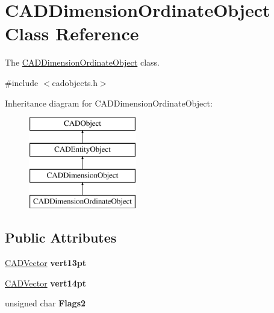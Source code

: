 \hypertarget{class_c_a_d_dimension_ordinate_object}{}\section{C\+A\+D\+Dimension\+Ordinate\+Object Class Reference}
\label{class_c_a_d_dimension_ordinate_object}


The \hyperlink{class_c_a_d_dimension_ordinate_object}{C\+A\+D\+Dimension\+Ordinate\+Object} class.  




{\ttfamily \#include $<$cadobjects.\+h$>$}

Inheritance diagram for C\+A\+D\+Dimension\+Ordinate\+Object\+:\begin{figure}[H]
\begin{center}
\leavevmode
\includegraphics[height=4.000000cm]{class_c_a_d_dimension_ordinate_object}
\end{center}
\end{figure}
\subsection*{Public Attributes}
\begin{DoxyCompactItemize}
\item 
\hyperlink{class_c_a_d_vector}{C\+A\+D\+Vector} {\bfseries vert13pt}\hypertarget{class_c_a_d_dimension_ordinate_object_aa3029046f411076a3e50f92b5c958c9b}{}\label{class_c_a_d_dimension_ordinate_object_aa3029046f411076a3e50f92b5c958c9b}

\item 
\hyperlink{class_c_a_d_vector}{C\+A\+D\+Vector} {\bfseries vert14pt}\hypertarget{class_c_a_d_dimension_ordinate_object_af6eef204a20ec4a6bbc5b9eb54a01659}{}\label{class_c_a_d_dimension_ordinate_object_af6eef204a20ec4a6bbc5b9eb54a01659}

\item 
unsigned char {\bfseries Flags2}\hypertarget{class_c_a_d_dimension_ordinate_object_a8b66bf4d3cd7ae8e51a15e9115519cbe}{}\label{class_c_a_d_dimension_ordinate_object_a8b66bf4d3cd7ae8e51a15e9115519cbe}

\end{DoxyCompactItemize}
